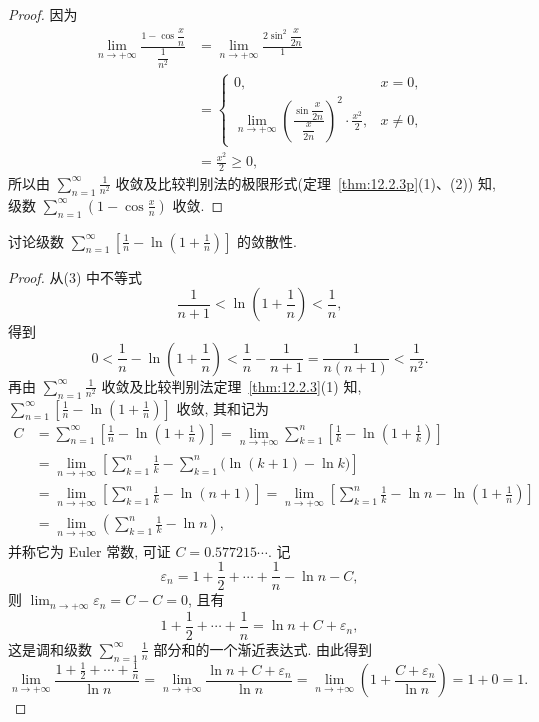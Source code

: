 \begin{proof}
因为
\begin{align*}
  \lim_{n\to+\infty}\frac{1-\cos\dfrac{x}{n}}{\dfrac{1}{n^{2}}}
  &=\lim_{n\to+\infty}\frac{2\sin^{2}\dfrac{x}{2n}}{1} \\
  &=\left\{\begin{array}{ll}
  0, & x=0,\\[
2pt]
  \displaystyle\lim_{n\to+\infty}
  \left(\frac{\sin\dfrac{x}{2n}}{\dfrac{x}{2n}}\right)^{2}\cdot\frac{x^{2}}{2}, & x\neq0,
  \end{array}\right. \\
  &=\frac{x^{2}}{2}\geqslant0,
\end{align*}
所以由 $\sum_{n=1}^{\infty}\frac{1}{n^{2}}$ 收敛及比较判别法的极限形式(定理~\ref{thm:12.2.3p}(1)、(2)) 知, 级数 $\sum_{n=1}^{\infty}\left(1-\cos\frac{x}{n}\right)$ 收敛.
\end{proof}
\begin{example}\label{ex:12.2.8}
讨论级数 $\sum_{n=1}^{\infty}\left[\frac{1}{n}-\ln\left(1+\frac{1}{n}\right)\right]$ 的敛散性.
\end{example}
\begin{proof}
从(3) 中不等式
\[
  \frac{1}{n+1}<\ln\left(1+\frac{1}{n}\right)<\frac{1}{n},
\]
得到
\[
  0<\frac{1}{n}-\ln\left(1+\frac{1}{n}\right)
  <\frac{1}{n}-\frac{1}{n+1}=\frac{1}{n(n+1)}<\frac{1}{n^{2}}.
\]
再由 $\sum_{n=1}^{\infty}\frac{1}{n^{2}}$ 收敛及比较判别法定理~\ref{thm:12.2.3}(1) 知, $\sum_{n=1}^{\infty}\left[\frac{1}{n}-\ln\left(1+\frac{1}{n}\right)\right]$ 收敛, 其和记为
\begin{align*}
  C&=\sum_{n=1}^{\infty}\left[\frac{1}{n}-\ln\left(1+\frac{1}{n}\right)\right]
   =\lim_{n\to+\infty}\sum_{k=1}^{n}\left[\frac{1}{k}-\ln\left(1+\frac{1}{k}\right)\right] \\
  &=\lim_{n\to+\infty}\left[\sum_{k=1}^{n}\frac{1}{k}-\sum_{k=1}^{n}\bigl(\ln(k+1)-\ln k\bigr)\right] \\
  &=\lim_{n\to+\infty}\left[\sum_{k=1}^{n}\frac{1}{k}-\ln(n+1)\right]
   =\lim_{n\to+\infty}\left[\sum_{k=1}^{n}\frac{1}{k}-\ln n-\ln\left(1+\frac{1}{n}\right)\right] \\
  &=\lim_{n\to+\infty}\left(\sum_{k=1}^{n}\frac{1}{k}-\ln n\right),
\end{align*}
并称它为 Euler 常数, 可证 $C=0.577215\cdots$. 记
\[
  \varepsilon_{n}=1+\frac{1}{2}+\cdots+\frac{1}{n}-\ln n-C,
\]
则 $\lim_{n\to+\infty}\varepsilon_{n}=C-C=0$, 且有
\[
  1+\frac{1}{2}+\cdots+\frac{1}{n}=\ln n+C+\varepsilon_{n},
\]
这是调和级数 $\sum_{n=1}^{\infty}\frac{1}{n}$ 部分和的一个渐近表达式. 由此得到
\[
  \lim_{n\to+\infty}\frac{1+\frac{1}{2}+\cdots+\frac{1}{n}}{\ln n}
  =\lim_{n\to+\infty}\frac{\ln n+C+\varepsilon_{n}}{\ln n}
  =\lim_{n\to+\infty}\left(1+\frac{C+\varepsilon_{n}}{\ln n}\right)=1+0=1.
\]
\end{proof}

